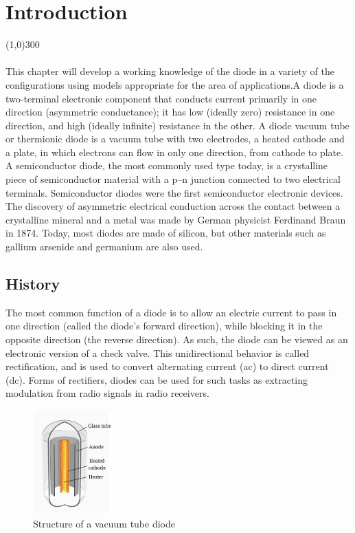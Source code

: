 \documentclass{article}
\begin{document}
	\section{Introduction}\label{sec:Intro}
	\line(1,0){300}\\\\
	This chapter will develop a working knowledge of the diode in a variety of the configurations using models appropriate for the area of applications.A diode is a two-terminal electronic component that conducts current primarily in one direction (asymmetric conductance); it has low (ideally zero) resistance in one direction, and high (ideally infinite) resistance in the other. A diode vacuum tube or thermionic diode is a vacuum tube with two electrodes, a heated cathode and a plate, in which electrons can flow in only one direction, from cathode to plate. A semiconductor diode, the most commonly used type today, is a crystalline piece of semiconductor material with a p–n junction connected to two electrical terminals. Semiconductor diodes were the first semiconductor electronic devices. The discovery of asymmetric electrical conduction across the contact between a crystalline mineral and a metal was made by German physicist Ferdinand Braun in 1874. Today, most diodes are made of silicon, but other materials such as gallium arsenide and germanium are also used.\\
	\newpage
	\subsection{History}
	The most common function of a diode is to allow an electric current to pass in one direction (called the diode's forward direction), while blocking it in the opposite direction (the reverse direction). As such, the diode can be viewed as an electronic version of a check valve. This unidirectional behavior is called rectification, and is used to convert alternating current (ac) to direct current (dc). Forms of rectifiers, diodes can be used for such tasks as extracting modulation from radio signals in radio receivers.
	\begin{figure}[H]
		\centering
		\includegraphics[height=4cm]{330px-Diode-english-text.svg.png}
		\caption{Structure of a vacuum tube diode}
	\end{figure}
\end{document}
